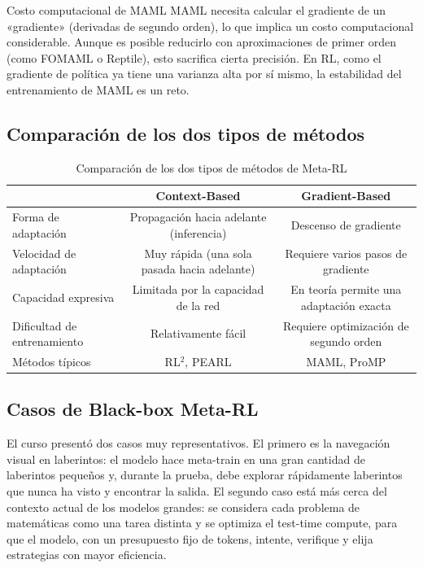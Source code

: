 \documentclass[a4paper]{article}
\begin{document}
\begin{warningbox}{Costo computacional de MAML}
MAML necesita calcular el gradiente de un «gradiente» (derivadas de segundo orden), lo que implica un costo computacional considerable. Aunque es posible reducirlo con aproximaciones de primer orden (como FOMAML o Reptile), esto sacrifica cierta precisión. En RL, como el gradiente de política ya tiene una varianza alta por sí mismo, la estabilidad del entrenamiento de MAML es un reto.
\end{warningbox}

\subsection{Comparación de los dos tipos de métodos}

\begin{table}[H]
\centering
\begin{tabular}{lcc}
\toprule
& \textbf{Context-Based} & \textbf{Gradient-Based} \\
\midrule
Forma de adaptación & Propagación hacia adelante (inferencia) & Descenso de gradiente \\
Velocidad de adaptación & Muy rápida (una sola pasada hacia adelante) & Requiere varios pasos de gradiente \\
Capacidad expresiva & Limitada por la capacidad de la red & En teoría permite una adaptación exacta \\
Dificultad de entrenamiento & Relativamente fácil & Requiere optimización de segundo orden \\
Métodos típicos & RL$^2$, PEARL & MAML, ProMP \\
\bottomrule
\end{tabular}
\caption{Comparación de los dos tipos de métodos de Meta-RL}
\end{table}

\subsection{Casos de Black-box Meta-RL}

El curso presentó dos casos muy representativos. El primero es la navegación visual en laberintos: el modelo hace meta-train en una gran cantidad de laberintos pequeños y, durante la prueba, debe explorar rápidamente laberintos que nunca ha visto y encontrar la salida. El segundo caso está más cerca del contexto actual de los modelos grandes: se considera cada problema de matemáticas como una tarea distinta y se optimiza el test-time compute, para que el modelo, con un presupuesto fijo de tokens, intente, verifique y elija estrategias con mayor eficiencia.
\end{document}
